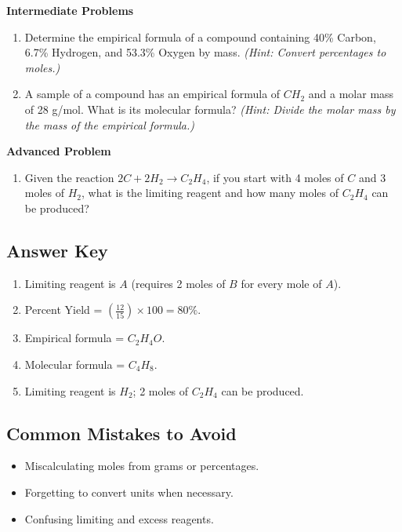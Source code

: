 \documentclass[12pt]{article}
\begin{document}
\textbf{Intermediate Problems}
\begin{enumerate}[3.]
    \item Determine the empirical formula of a compound containing 40\% Carbon, 6.7\% Hydrogen, and 53.3\% Oxygen by mass. 
    \textit{(Hint: Convert percentages to moles.)}
    
    \item A sample of a compound has an empirical formula of \( CH_2 \) and a molar mass of 28 g/mol. What is its molecular formula? 
    \textit{(Hint: Divide the molar mass by the mass of the empirical formula.)}
\end{enumerate}

\textbf{Advanced Problem}
\begin{enumerate}[5.]
    \item Given the reaction \( 2C + 2H_2 \rightarrow C_2H_4 \), if you start with 4 moles of \( C \) and 3 moles of \( H_2 \), what is the limiting reagent and how many moles of \( C_2H_4 \) can be produced?
\end{enumerate}

\subsection*{Answer Key}

\begin{enumerate}[1.]
    \item Limiting reagent is \( A \) (requires 2 moles of \( B \) for every mole of \( A \)).
    \item Percent Yield = \( \left( \frac{12}{15} \right) \times 100 = 80\% \).
    \item Empirical formula = \( C_2H_4O \).
    \item Molecular formula = \( C_4H_8 \).
    \item Limiting reagent is \( H_2 \); 2 moles of \( C_2H_4 \) can be produced.
\end{enumerate}

\subsection*{Common Mistakes to Avoid}
\begin{itemize}
    \item Miscalculating moles from grams or percentages.
    \item Forgetting to convert units when necessary.
    \item Confusing limiting and excess reagents.
\end{itemize}
\end{document}
